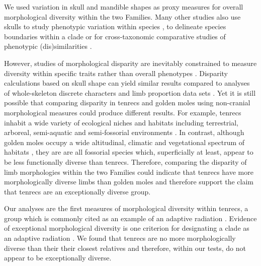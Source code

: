 \documentclass[12pt,a4paper]{article}
\begin{document}
	
	
	We used variation in skull and mandible shapes as proxy measures for overall morphological diversity within the two Families. Many other studies also use skulls to study phenotypic variation within species \citep{Blagojevic2011, Bornholdt2008}, to delineate species boundaries within a clade \citep[e.g.][]{Panchetti2008} or for cross-taxonomic comparative studies of phenotypic (dis)similarities \citep[e.g.][]{Ruta2013, Goswami2011, Wroe2007}.
	
	However, studies of morphological disparity are inevitably constrained to measure diversity within specific traits rather than overall phenotypes \citep{Roy1997}. Disparity calculations based on skull shape can yield similar results compared to analyses of whole-skeleton discrete characters and limb proportion data sets \citep{Foth2012}. Yet it is still possible that comparing disparity in tenrecs and golden moles using non-cranial morphological measures could produce different results. For example, tenrecs inhabit a wide variety of ecological niches and habitats including terrestrial, arboreal, semi-aquatic and semi-fossorial environments \citep{Soarimalala2011}. In contrast, although golden moles occupy a wide altitudinal, climatic and vegetational spectrum of habitats \citep{Bronner1995}, they are are all fossorial species which, superficially at least, appear to be less functionally diverse than tenrecs. Therefore, comparing the disparity of limb morphologies within the two Families could indicate that tenrecs have more morphologically diverse limbs than golden moles and therefore support the claim that tenrecs are an exceptionally diverse group. 
	
	

 	Our analyses are the first measures of morphological diversity within tenrecs, a group which is commonly cited as an example of an adaptive radiation \citep{Olson2013}. Evidence of exceptional morphological diversity is one criterion for designating a clade as an adaptive radiation \citep{Losos2010a}. We found that tenrecs are no more morphologically diverse than their their closest relatives and therefore, within our tests, do not appear to be exceptionally diverse.   
 	
\end{document}
